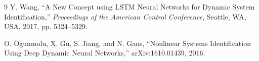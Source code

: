 \documentclass[11pt]{article}
\begin{document}
\begin{thebibliography}{9}
Y. Wang, ``A New Concept using LSTM Neural Networks for Dynamic System Identification,'' \textit{Proceedings of the American Control Conference}, Seattle, WA, USA, 2017, pp. 5324--5329.

O. Ogunmolu, X. Gu, S. Jiang, and N. Gans, ``Nonlinear Systems Identification Using Deep Dynamic Neural Networks,'' arXiv:1610.01439, 2016.
\end{thebibliography}
\end{document}
